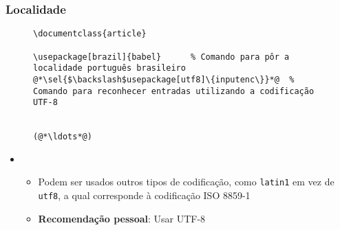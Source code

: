 \begin{frame}[fragile] \frametitle{Localidade}
\begin{figure}[!t]
\begin{lstlisting}
\documentclass{article}

\usepackage[brazil]{babel}		% Comando para pôr a localidade português brasileiro
@*\sel{$\backslash$usepackage[utf8]\{inputenc\}}*@	% Comando para reconhecer entradas utilizando a codificação UTF-8


(@*\ldots*@)
\end{lstlisting}
\end{figure}

\begin{itemize}
	\item {}
	\begin{itemize}
		\item Podem ser usados outros tipos de codificação, como \texttt{latin1} em vez de \texttt{utf8}, a qual corresponde à codificação ISO 8859-1
		\item \textbf{Recomendação pessoal}: Usar UTF-8
	\end{itemize}
\end{itemize}
\end{frame}